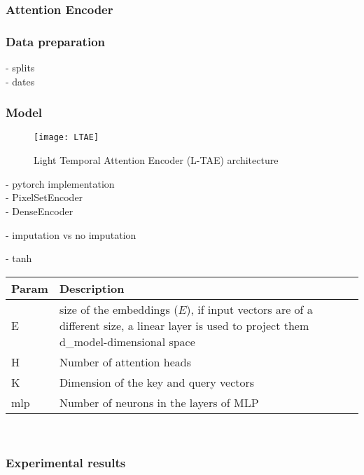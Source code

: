 \subsubsection{Attention Encoder}

\subsubsection{Data preparation}
- splits\\
- dates\\

\subsubsection{Model}

\begin{figure}[!htbp]
  \centering
  \texttt{[image: LTAE]}
  \caption{Light Temporal Attention Encoder  (L-TAE) architecture \cite{LTAE}}
  \label{tab:LTAErchitecture}
\end{figure}

- pytorch implementation\\
- PixelSetEncoder\\
- DenseEncoder

- imputation vs no imputation

- tanh

\begin{table}[ht]
  \centering
  \begin{tabular}{l p{13cm}}
     \hline
     Param & Description\\ \hline 
     E & size of the embeddings ($E$), if input vectors are of a different size, a linear layer is used to project them d\_model-dimensional space \\
     H & Number of attention heads  \\
     K & Dimension of the key and query vectors  \\
     mlp & Number of neurons in the layers of MLP \\
     \hline
  \end{tabular}\\
  \label{tab:LTAEconfig}
\end{table} 

\subsubsection{Experimental results}

